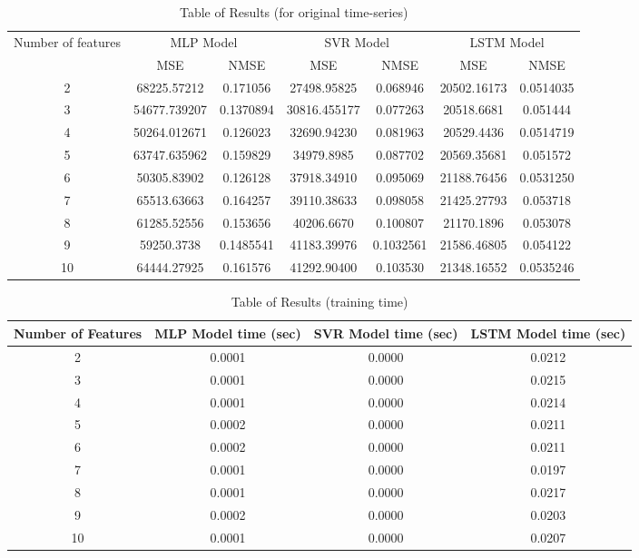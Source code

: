 \documentclass{article}
\begin{document}
\begin{table}[h]
	\begin{tabular}{ccccccc}
		\toprule
		\multirow{2}{*}{Number of features} & \multicolumn{2}{c}{MLP Model} & \multicolumn{2}{c}{SVR Model} & \multicolumn{2}{c}{LSTM Model} \\ 
		\cmidrule {2-7} & MSE & NMSE & MSE & NMSE & MSE & NMSE  \\
		\midrule
		2 & 68225.57212 & 0.171056 & 27498.95825 & 0.068946 & 20502.16173 & 0.0514035 \\
		\midrule
		3 & 54677.739207 & 0.1370894 & 30816.455177 & 0.077263 & 20518.6681 & 0.051444 \\
		\midrule
		4 & 50264.012671 & 0.126023 & 32690.94230 & 0.081963 & 20529.4436 & 0.0514719 \\
		\midrule
		5 & 63747.635962 & 0.159829 & 34979.8985 & 0.087702 & 20569.35681 & 0.051572 \\
		\midrule
		6 & 50305.83902 & 0.126128 & 37918.34910 & 0.095069 & 21188.76456 & 0.0531250 \\
		\midrule
		7 & 65513.63663 & 0.164257 & 39110.38633 & 0.098058 & 21425.27793 & 0.053718 \\
		\midrule
		8 & 61285.52556 & 0.153656 & 40206.6670 & 0.100807 & 21170.1896 & 0.053078 \\
		\midrule
		9 & 59250.3738 & 0.1485541 & 41183.39976 & 0.1032561 & 21586.46805 & 0.054122 \\
		\midrule
		10 & 64444.27925 & 0.161576 & 41292.90400 & 0.103530 & 21348.16552 & 0.0535246 \\
		\bottomrule
	\end{tabular}
	\caption{Table of Results (for original time-series)}
\end{table}

\begin{table}[ht]
	\begin{tabular}{cccc}
		\toprule
		Number of Features & MLP Model time (sec) & SVR Model time (sec) & LSTM Model time (sec) \\
		\midrule 2 & 0.0001 & 0.0000 & 0.0212 \\ \midrule
		3 & 0.0001 & 0.0000 & 0.0215 \\
		\midrule
		4 & 0.0001 & 0.0000 & 0.0214 \\
		\midrule
		5 & 0.0002 & 0.0000 & 0.0211 \\
		\midrule
		6 & 0.0002 & 0.0000 & 0.0211 \\
		\midrule
		7 & 0.0001 & 0.0000 & 0.0197 \\
		\midrule
		8 & 0.0001 & 0.0000 & 0.0217 \\
		\midrule
		9 & 0.0002 & 0.0000 & 0.0203 \\
		\midrule
		10 & 0.0001 & 0.0000 & 0.0207 \\
		\bottomrule
	\end{tabular}
	\caption{Table of Results (training time)}
\end{table}
\end{document}

